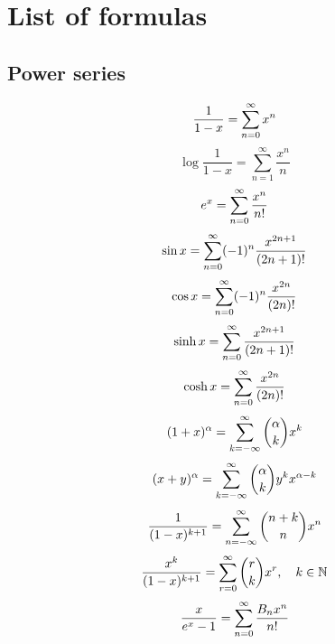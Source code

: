 \section*{List of formulas}
\subsection*{Power series}
\begin{equation} \label{eq:power_geom}
    \frac{1}{1-x} = \bsum x^n
\end{equation}
\begin{equation} \label{eq:power_loggeom}
    \log \frac{1}{1-x} = \sum_{n=1}^{\infty} \frac{x^n}{n}
\end{equation}
\begin{equation} \label{eq:power_exp}
    e^x = \bsum \frac{x^n}{n!}
\end{equation}
\begin{equation} \label{eq:power_sin}
    \sin x = \bsum (-1)^n \frac{x^{2n+1}}{(2n+1)!}
\end{equation}
\begin{equation} \label{eq:power_cos}
    \cos x = \bsum (-1)^n \frac{x^{2n}}{(2n)!}
\end{equation}
\begin{equation} \label{eq:power_sinh}
    \sinh x = \bsum \frac{x^{2n+1}}{(2n+1)!}
\end{equation}
\begin{equation} \label{eq:power_cosh}
    \cosh x = \bsum \frac{x^{2n}}{(2n)!}
\end{equation}
\begin{equation} \label{eq:binom_num}
    (1+x)^{\alpha} = \infsum[k] \binom{\alpha}{k}x^k
\end{equation}
\begin{equation} \label{eq:binom_num2}
    (x+y)^{\alpha} = \infsum[k] \binom{\alpha}{k}y^kx^{\alpha - k}
\end{equation}
\begin{equation} \label{eq:binom_denom}
    \frac{1}{(1-x)^{k+1}} = \infsum \binom{n+k}{n}x^n
\end{equation}
\begin{equation} \label{eq:binom_denom_num_single}
    \frac{x^k}{(1-x)^{k+1}} = \bsum[r] \binom{r}{k}x^r, \quad k\in\mathbb{N}
\end{equation}
\begin{equation} \label{eq:power_bernoulli}
    \frac{x}{e^x-1} = \bsum \frac{B_nx^n}{n!}
\end{equation}
